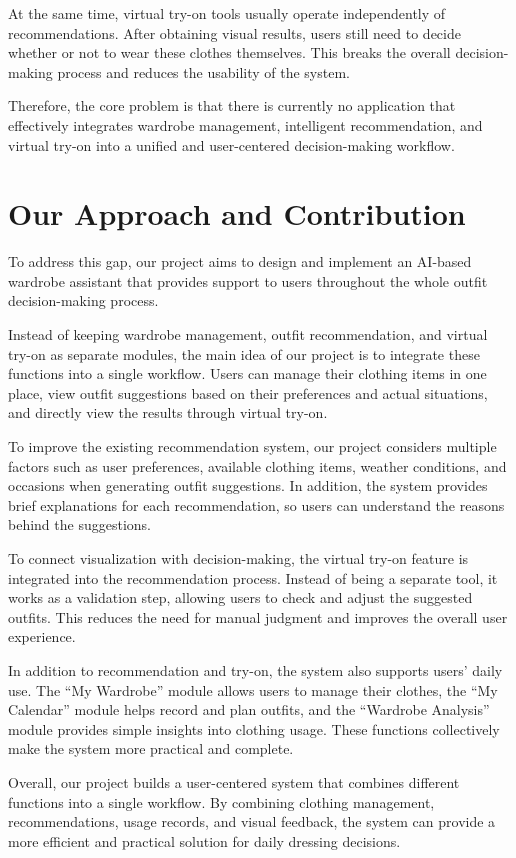 At the same time, virtual try-on tools usually operate independently of recommendations. After obtaining visual results, users still need to decide whether or not to wear these clothes themselves. This breaks the overall decision-making process and reduces the usability of the system.

Therefore, the core problem is that there is currently no application that effectively integrates wardrobe management, intelligent recommendation, and virtual try-on into a unified and user-centered decision-making workflow.


\section{Our Approach and Contribution}
To address this gap, our project aims to design and implement an AI-based wardrobe assistant that provides support to users throughout the whole outfit decision-making process.

Instead of keeping wardrobe management, outfit recommendation, and virtual try-on as separate modules, the main idea of our project is to integrate these functions into a single workflow. Users can manage their clothing items in one place, view outfit suggestions based on their preferences and actual situations, and directly view the results through virtual try-on.

To improve the existing recommendation system, our project considers multiple factors such as user preferences, available clothing items, weather conditions, and occasions when generating outfit suggestions. In addition, the system provides brief explanations for each recommendation, so users can understand the reasons behind the suggestions.

To connect visualization with decision-making, the virtual try-on feature is integrated into the recommendation process. Instead of being a separate tool, it works as a validation step, allowing users to check and adjust the suggested outfits. This reduces the need for manual judgment and improves the overall user experience.

In addition to recommendation and try-on, the system also supports users' daily use. The “My Wardrobe” module allows users to manage their clothes, the “My Calendar” module helps record and plan outfits, and the “Wardrobe Analysis” module provides simple insights into clothing usage. These functions collectively make the system more practical and complete.

Overall, our project builds a user-centered system that combines different functions into a single workflow. By combining clothing management, recommendations, usage records, and visual feedback, the system can provide a more efficient and practical solution for daily dressing decisions.
